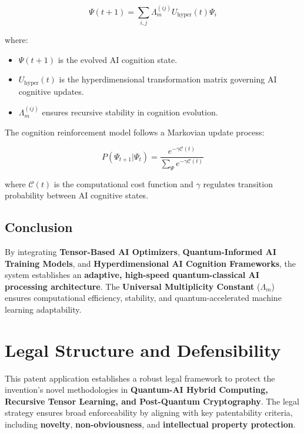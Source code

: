 \documentclass{article}
\theoremstyle{plain}
\begin{document}
\begin{equation}
    \Psi(t+1) = \sum_{i,j} \Lambda_m^{(ij)} U_{\text{hyper}}(t) \Psi_i
\end{equation}

where:
\begin{itemize}
    \item $\Psi(t+1)$ is the evolved AI cognition state.
    \item $U_{\text{hyper}}(t)$ is the hyperdimensional transformation matrix governing AI cognitive updates.
    \item $\Lambda_m^{(ij)}$ ensures recursive stability in cognition evolution.
\end{itemize}

The cognition reinforcement model follows a Markovian update process:

\begin{equation}
    P(\Psi_{t+1} | \Psi_t) = \frac{e^{-\gamma \mathcal{C}(t)}}{\sum_{\Psi} e^{-\gamma \mathcal{C}(t)}}
\end{equation}

where $\mathcal{C}(t)$ is the computational cost function and $\gamma$ regulates transition probability between AI cognitive states.

\subsection{Conclusion}

By integrating \textbf{Tensor-Based AI Optimizers}, \textbf{Quantum-Informed AI Training Models}, and \textbf{Hyperdimensional AI Cognition Frameworks}, the system establishes an \textbf{adaptive, high-speed quantum-classical AI processing architecture}. The \textbf{Universal Multiplicity Constant} ($\Lambda_m$) ensures computational efficiency, stability, and quantum-accelerated machine learning adaptability.

\section{Legal Structure and Defensibility}

This patent application establishes a robust legal framework to protect the invention’s novel methodologies in \textbf{Quantum-AI Hybrid Computing, Recursive Tensor Learning, and Post-Quantum Cryptography}. The legal strategy ensures broad enforceability by aligning with key patentability criteria, including \textbf{novelty}, \textbf{non-obviousness}, and \textbf{intellectual property protection}.
\end{document}
